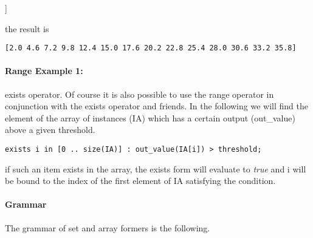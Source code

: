 \vspace{2mm}

{\tok [i : i in [2.0 .. 36.7 : by 2.6]]}

\vspace{2mm}

\noindent
the result is

\vspace{2mm}

{\tt [2.0 4.6 7.2 9.8 12.4 15.0 17.6 20.2 22.8 25.4 28.0 30.6 33.2 35.8]}

\vspace{2mm}


\paragraph{Range Example 1:} {\tok exists} operator.  Of course it is
also possible to use the range operator in conjunction with the {\tok
exists} operator and friends.  In the following we will find the
element of the array of instances ({\tok IA}) which has a certain output
({\tok out\_value}) above a given threshold.

\vspace{2mm}

{\tt exists i in [0 .. size(IA)] : out\_value(IA[i]) > threshold;}

\vspace{2mm}

\noindent
if such an item exists in the array, the {\tok exists} form will
evaluate to {\em true} and {\tok i} will be bound to the index of the
first element of {\tok IA} satisfying the condition.


\paragraph{Grammar}

The grammar of set and array formers is the following.

